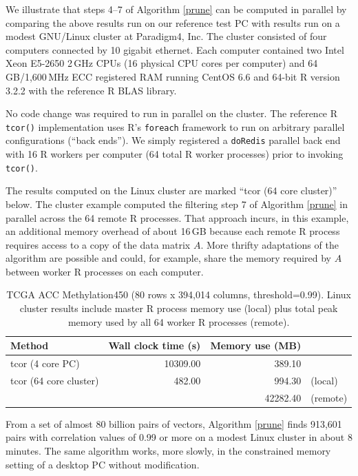 \documentclass{article}
\let\proglang=\textsf
\numberwithin{algorithmctr}{section}
\begin{document}
We illustrate that steps 4--7 of Algorithm \ref{prune} can be computed in
parallel by comparing the above results run on our reference test PC with
results run on a modest GNU/Linux cluster at Paradigm4, Inc. The cluster
consisted of four computers connected by 10 gigabit ethernet. Each computer
contained two Intel Xeon E5-2650 2$\,$GHz CPUs (16 physical CPU cores per
computer) and 64$\,$GB/1,600$\,$MHz ECC registered RAM running CentOS 6.6 and
64-bit \proglang{R} version 3.2.2 with the reference \proglang{R} BLAS library.

No code change was required to run in parallel on the cluster. The reference \proglang{R}
{\tt tcor()} implementation uses \proglang{R}'s {\tt foreach} \cite{foreach} framework to
run on arbitrary parallel configurations (``back ends''). We simply registered
a {\tt doRedis} \cite{doredis} parallel back end with 16 \proglang{R} workers per computer
(64 total \proglang{R} worker processes) prior to invoking {\tt tcor()}.

The results computed on the Linux cluster are marked ``tcor (64 core cluster)''
below. The cluster example computed the filtering step 7 of Algorithm
\ref{prune} in parallel across the 64 remote \proglang{R} processes. That approach incurs,
in this example, an additional memory overhead of about 16$\,$GB because each
remote \proglang{R} process requires access to a copy of the data matrix $A$. More thrifty
adaptations of the algorithm are possible and could, for example, share the
memory required by $A$ between worker \proglang{R} processes on each computer.

\begin{table}[ht]
\centering
\begingroup\small
\begin{tabular}{lrrl}
  \hline
Method & Wall clock time (s) & Memory use (MB) &   \\ 
  \hline
tcor (4 core PC) & 10309.00 & 389.10 &  \\ 
  tcor (64 core cluster) & 482.00 & 994.30 & (local) \\ 
   &  & 42282.40 & (remote) \\ 
   \hline
\end{tabular}
\endgroup
\caption{TCGA ACC Methylation450 (80 rows x 394,014 columns, threshold=0.99). Linux cluster results include master R process memory use (local) plus total peak memory used by all 64 worker R processes (remote).} 
\label{TCGA3}
\end{table}From a set of almost 80 billion pairs of vectors, Algorithm \ref{prune} finds 913,601
pairs with correlation values of 0.99 or more on a modest Linux
cluster in about 8 minutes. The same algorithm works, more slowly, in
the constrained memory setting of a desktop PC without modification.
\end{document}
